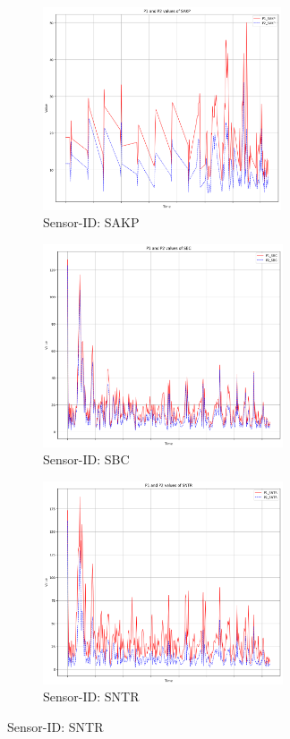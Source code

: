 \documentclass[12pt,a4paper,twoside]{scrartcl}
\numberwithin{equation}{section}
\begin{document}
\begin{figure}[H]
  \centering
  \begin{subfigure}[t]{0.32\textwidth}
    \includegraphics[width=\textwidth,height=6cm]{figures/1D_SAKP_plot}%
    \caption{Sensor-ID: SAKP}
  \end{subfigure}
  \begin{subfigure}[t]{0.32\textwidth}
    \includegraphics[width=\textwidth,height=6cm]{figures/1D_SBC_plot}%
    \caption{Sensor-ID: SBC}
  \end{subfigure}
  \begin{subfigure}[t]{0.32\textwidth}
    \includegraphics[width=\textwidth,height=6cm]{figures/1D_SNTR_plot}%
    \caption{Sensor-ID: SNTR}
  \end{subfigure}


\end{figure}
\end{document}
